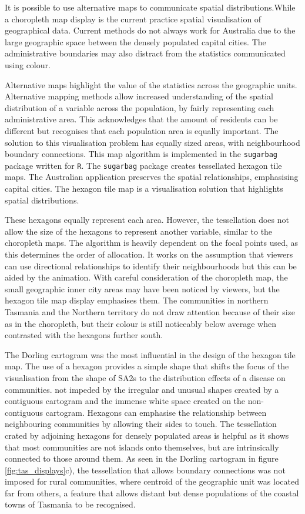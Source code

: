 It is possible to use alternative maps to communicate spatial
distributions.While a choropleth map display is the current practice
spatial visualisation of geographical data. Current methods do not
always work for Australia due to the large geographic space between the
densely populated capital cities. The administrative boundaries may also
distract from the statistics communicated using colour.

Alternative maps highlight the value of the statistics across the
geographic units. Alternative mapping methods allow increased
understanding of the spatial distribution of a variable across the
population, by fairly representing each administrative area. This
acknowledges that the amount of residents can be different but
recognises that each population area is equally important. The solution
to this visualisation problem has equally sized areas, with
neighbourhood boundary connections. This map algorithm is implemented in
the \texttt{sugarbag} \citep{sugarbag} package written for \texttt{R}.
The \texttt{sugarbag} package creates tessellated hexagon tile maps. The
Australian application preserves the spatial relationships, emphasising
capital cities. The hexagon tile map is a visualisation solution that
highlights spatial distributions.

These hexagons equally represent each area. However, the tessellation
does not allow the size of the hexagons to represent another variable,
similar to the choropleth maps. The algorithm is heavily dependent on
the focal points used, as this determines the order of allocation. It
works on the assumption that viewers can use directional relationships
to identify their neighbourhoods but this can be aided by the animation.
With careful consideration of the choropleth map, the small geographic
inner city areas may have been noticed by viewers, but the hexagon tile
map display emphasises them. The communities in northern Tasmania and
the Northern territory do not draw attention because of their size as in
the choropleth, but their colour is still noticeably below average when
contrasted with the hexagons further south.

The Dorling cartogram was the most influential in the design of the
hexagon tile map. The use of a hexagon provides a simple shape that
shifts the focus of the visualisation from the shape of SA2s to the
distribution effects of a disease on communities. not impeded by the
irregular and unusual shapes created by a contiguous cartogram and the
immense white space created on the non-contiguous cartogram. Hexagons
can emphasise the relationship between neighbouring communities by
allowing their sides to touch. The tessellation crated by adjoining
hexagons for densely populated areas is helpful as it shows that most
communities are not islands onto themselves, but are intrinsically
connected to those around them. As seen in the Dorling cartogram in
figure \ref{fig:tas_displays}c), the tessellation that allows boundary
connections was not imposed for rural communities, where centroid of the
geographic unit was located far from others, a feature that allows
distant but dense populations of the coastal towns of Tasmania to be
recognised.

